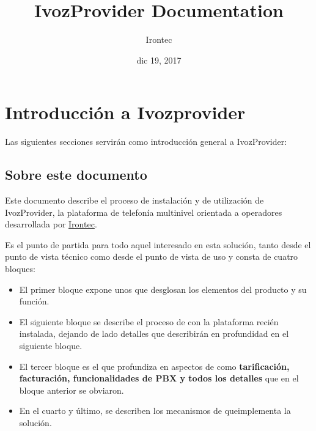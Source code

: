 \documentclass[letterpaper,10pt,spanish]{sphinxmanual}
\title{IvozProvider Documentation}
\date{dic 19, 2017}
\author{Irontec}
\begin{document}
\maketitle
\tableofcontents
{}\label{index::doc}



\chapter{Introducción a Ivozprovider}
\label{intro/index::doc}\label{intro/index:introduction-to-ivozprovider}\label{intro/index:ivozprovider-official-documentation}
Las siguientes secciones servirán como introducción general a IvozProvider:


\section{Sobre este documento}
\label{intro/about:about-this-document}\label{intro/about::doc}
Este documento describe el proceso de instalación y de utilización de IvozProvider, la plataforma de telefonía multinivel orientada a operadores desarrollada por \href{http://irontec.com}{Irontec}.

Es el punto de partida para todo aquel interesado en esta solución, tanto desde el punto de vista técnico como desde el punto de vista de uso y consta de cuatro bloques:
\begin{itemize}
\item {} 
El primer bloque expone unos {\hyperref[index:concepts]{}} que desglosan los elementos del producto y su función.

\item {} 
El siguiente bloque se describe el proceso de {\hyperref[index:installation]{}} con la plataforma recién instalada, dejando de lado detalles que describirán en profundidad en el siguiente bloque.

\item {} 
El tercer bloque es el que profundiza en aspectos de {\hyperref[index:advanced]{}} como \textbf{tarificación, facturación, funcionalidades de PBX y todos los detalles} que en el bloque anterior se obviaron.

\item {} 
En el cuarto y último, se describen los mecanismos de {\hyperref[index:security]{}} queimplementa la solución.

\end{itemize}
\end{document}
